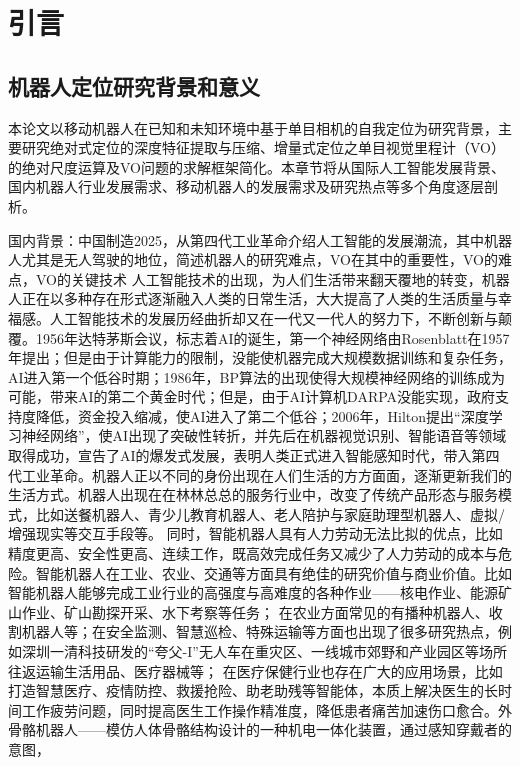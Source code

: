 \chapter{引言}
\label{ch:introduction}
\section{机器人定位研究背景和意义}

本论文以移动机器人在已知和未知环境中基于单目相机的自我定位为研究背景，主要研究绝对式定位的深度特征提取与压缩、增量式定位之单目视觉里程计（VO）的绝对尺度运算及VO问题的求解框架简化。本章节将从国际人工智能发展背景、国内机器人行业发展需求、移动机器人的发展需求及研究热点等多个角度逐层剖析。

国内背景：中国制造2025\cite{2017Made}，从第四代工业革命介绍人工智能的发展潮流，其中机器人尤其是无人驾驶的地位，简述机器人的研究难点，VO在其中的重要性，VO的难点，VO的关键技术
人工智能技术的出现，为人们生活带来翻天覆地的转变，机器人正在以多种存在形式逐渐融入人类的日常生活，大大提高了人类的生活质量与幸福感。人工智能技术的发展历经曲折却又在一代又一代人的努力下，不断创新与颠覆。1956年达特茅斯会议，标志着AI的诞生，第一个神经网络由Rosenblatt在1957年提出；但是由于计算能力的限制，没能使机器完成大规模数据训练和复杂任务，AI进入第一个低谷时期；1986年，BP算法的出现使得大规模神经网络的训练成为可能，带来AI的第二个黄金时代；但是，由于AI计算机DARPA没能实现，政府支持度降低，资金投入缩减，使AI进入了第二个低谷；2006年，Hilton提出“深度学习神经网络”，使AI出现了突破性转折，并先后在机器视觉识别、智能语音等领域取得成功，宣告了AI的爆发式发展，表明人类正式进入智能感知时代，带入第四代工业革命。机器人正以不同的身份出现在人们生活的方方面面，逐渐更新我们的生活方式。机器人出现在在林林总总的服务行业中，改变了传统产品形态与服务模式，比如送餐机器人、青少儿教育机器人、老人陪护与家庭助理型机器人、虚拟/增强现实等交互手段等。
同时，智能机器人具有人力劳动无法比拟的优点，比如精度更高、安全性更高、连续工作，既高效完成任务又减少了人力劳动的成本与危险。智能机器人在工业、农业、交通等方面具有绝佳的研究价值与商业价值。比如智能机器人能够完成工业行业的高强度与高难度的各种作业——核电作业、能源矿山作业、矿山勘探开采、水下考察等任务；%
在农业方面常见的有播种机器人、收割机器人等；在安全监测、智慧巡检、特殊运输等方面也出现了很多研究热点，例如深圳一清科技研发的“夸父-I”无人车在重灾区、一线城市郊野和产业园区等场所往返运输生活用品、医疗器械等；
在医疗保健行业也存在广大的应用场景，比如打造智慧医疗、疫情防控、救援抢险、助老助残等智能体，本质上解决医生的长时间工作疲劳问题，同时提高医生工作操作精准度，降低患者痛苦加速伤口愈合。外骨骼机器人——模仿人体骨骼结构设计的一种机电一体化装置，通过感知穿戴者的意图，
